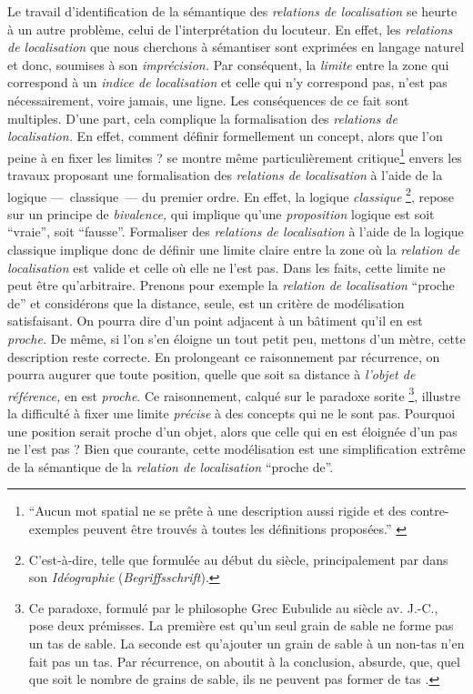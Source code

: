 Le travail d'identification de la sémantique des \emph{relations de
  localisation} se heurte à un autre problème, celui de
l'interprétation du locuteur. En effet, les \emph{relations de
  localisation} que nous cherchons à sémantiser sont exprimées en
langage naturel et donc, soumises à son \emph{imprécision.} Par
conséquent, la \emph{limite} entre la zone qui correspond à un
\emph{indice de localisation} et celle qui n'y correspond pas, n'est
pas nécessairement, voire jamais, une ligne. Les conséquences de ce
fait sont multiples. D'une part, cela complique la formalisation des
\emph{relations de localisation.} En effet, comment définir
formellement un concept, alors que l'on peine à en fixer les limites ?
\textcite{Vandeloise1986} se montre même particulièrement
critique\footnote{\enquote{Aucun mot spatial ne se prête à une
    description aussi rigide et des contre-exemples peuvent être
    trouvés à toutes les définitions proposées.}
  \autocite[p. 18]{Vandeloise1986}} envers les travaux proposant une
formalisation des \emph{relations de localisation} à l'aide de la
logique ---~classique~--- du premier ordre. En effet, la logique
\emph{classique} \footnote{C'est-à-dire, telle que formulée au début
  du  siècle, principalement par  dans son
  \emph{Idéographie} (\emph{Begriffsschrift}).}, repose sur un
principe de \emph{bivalence,} qui implique qu'une \emph{proposition}
logique est soit \enquote{vraie}, soit \enquote{fausse}. Formaliser
des \emph{relations de localisation} à l'aide de la logique classique
implique donc de définir une limite claire entre la zone où la
\emph{relation de localisation} est valide et celle où elle ne l'est
pas. Dans les faits, cette limite ne peut être qu'arbitraire. Prenons
pour exemple la \emph{relation de localisation} \enquote{proche de} et
considérons que la distance, seule, est un critère de modélisation
satisfaisant. On pourra dire d'un point adjacent à un bâtiment qu'il
en est \emph{proche.} De même, si l'on s'en éloigne un tout petit peu,
mettons d'un mètre, cette description reste correcte. En prolongeant
ce raisonnement par récurrence, on pourra augurer que toute position,
quelle que soit sa distance à \emph{l'objet de référence,} en est
\emph{proche}. Ce raisonnement, calqué sur le paradoxe sorite
\footnote{Ce paradoxe, formulé par le philosophe Grec Eubulide au
   siècle av. J.-C., pose deux prémisses. La première
  est qu'un seul grain de sable ne forme pas un tas de sable. La
  seconde est qu'ajouter un grain de sable à un non-tas n'en fait pas
  un tas. Par récurrence, on aboutit à la conclusion, absurde, que,
  quel que soit le nombre de grains de sable, ils ne peuvent pas
  former de tas \autocite{Sorensen2018,Hyde2018}.}, illustre la
difficulté à fixer une limite \emph{précise} à des concepts qui ne le
sont pas. Pourquoi une position serait proche d'un objet, alors que
celle qui en est éloignée d'un pas ne l'est pas ? Bien que courante,
cette modélisation est une simplification extrême de la sémantique de
la \emph{relation de localisation} \enquote{proche de}.

